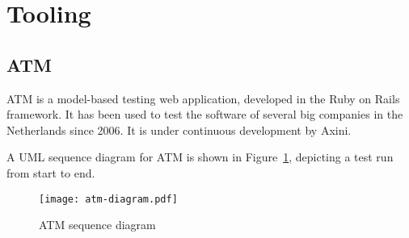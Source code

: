\section{Tooling}\label{sec:tooling}

\subsection{ATM}\label{sec:atm}
ATM is a model-based testing web application, developed in the Ruby on Rails framework. It has been used to test the software of several big companies in the Netherlands since 2006. It is under continuous development by Axini.

A UML sequence diagram for ATM is shown in Figure~\ref{fig:axini_tool}, depicting a test run from start to end.

\begin{figure}[h]
  \begin{center}
    \texttt{[image: atm-diagram.pdf]}
  \end{center}
  \caption{ATM sequence diagram}
  \label{fig:axini_tool}
\end{figure}

